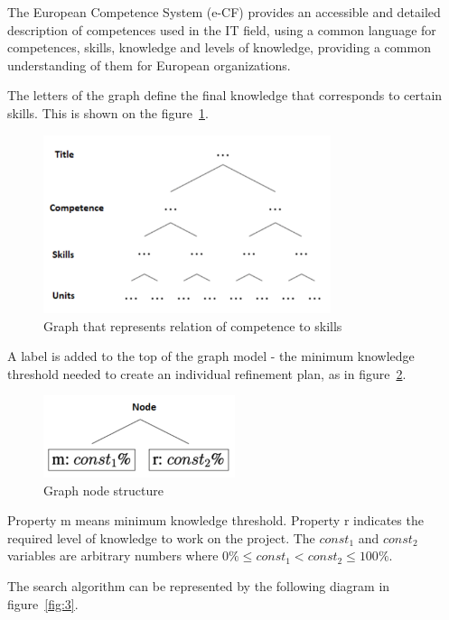 \documentclass[a4paper,14pt,oneside,final]{extarticle}
\begin{document}
The European Competence System (e-CF) provides an accessible and detailed description of competences used in the IT field, using a common language for competences, skills, knowledge and levels of knowledge, providing a common understanding of them for European organizations.

The letters of the graph define the final knowledge that corresponds to certain skills. This is shown on the figure~\ref{fig:1}.

\begin{figure}[H]
    \centering
    \includegraphics[width=0.75\textwidth]{fig1}
    \caption{Graph that represents relation of competence to skills}
    \label{fig:1}
\end{figure}

A label is added to the top of the graph model - the minimum knowledge threshold needed to create an individual refinement plan, as in figure~\ref{fig:2}.

\begin{figure}[H]
    \centering
    \includegraphics[width=0.5\textwidth]{fig2}
    \caption{Graph node structure}
    \label{fig:2}
\end{figure}

Property m means minimum knowledge threshold. Property r indicates the required level of knowledge to work on the project. The $const_1$ and $const_2$ variables are arbitrary numbers where $0\% \leq const_1 < const_2 \leq 100\%$.

The search algorithm can be represented by the following diagram in figure~\ref{fig:3}.
\end{document}
